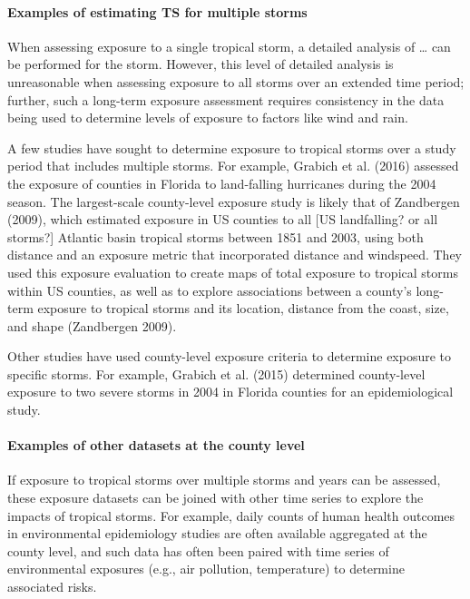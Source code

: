 \documentclass[]{elsarticle} %
\begin{document}
\paragraph{Examples of estimating TS for multiple
storms}\label{examples-of-estimating-ts-for-multiple-storms}

When assessing exposure to a single tropical storm, a detailed analysis
of \ldots{} can be performed for the storm. However, this level of
detailed analysis is unreasonable when assessing exposure to all storms
over an extended time period; further, such a long-term exposure
assessment requires consistency in the data being used to determine
levels of exposure to factors like wind and rain.

A few studies have sought to determine exposure to tropical storms over
a study period that includes multiple storms. For example, Grabich et
al. (2016) assessed the exposure of counties in Florida to land-falling
hurricanes during the 2004 season. The largest-scale county-level
exposure study is likely that of Zandbergen (2009), which estimated
exposure in US counties to all {[}US landfalling? or all storms?{]}
Atlantic basin tropical storms between 1851 and 2003, using both
distance and an exposure metric that incorporated distance and
windspeed. They used this exposure evaluation to create maps of total
exposure to tropical storms within US counties, as well as to explore
associations between a county's long-term exposure to tropical storms
and its location, distance from the coast, size, and shape (Zandbergen
2009).

Other studies have used county-level exposure criteria to determine
exposure to specific storms. For example, Grabich et al. (2015)
determined county-level exposure to two severe storms in 2004 in Florida
counties for an epidemiological study.

\paragraph{Examples of other datasets at the county
level}\label{examples-of-other-datasets-at-the-county-level}

If exposure to tropical storms over multiple storms and years can be
assessed, these exposure datasets can be joined with other time series
to explore the impacts of tropical storms. For example, daily counts of
human health outcomes in environmental epidemiology studies are often
available aggregated at the county level, and such data has often been
paired with time series of environmental exposures (e.g., air pollution,
temperature) to determine associated risks.
\end{document}
